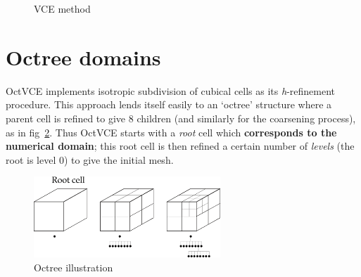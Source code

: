 \documentclass[pdftex, 12pt, a4paper]{report}
\begin{document}
\begin{figure}[htp]
        \centering
        \label{fig:VCE}
        \caption{VCE method}
\end{figure}

\section{Octree domains}\label{sec:domain}

OctVCE implements isotropic subdivision of cubical cells as its \emph{h}-refinement procedure.  This approach lends itself
easily to an `octree' structure where a parent cell is refined to give 8 children (and similarly for the coarsening process),
as in fig~\ref{fig:octree_diag}.  Thus OctVCE starts with a \emph{root} cell which \textbf{corresponds to the numerical domain};
this root cell is then refined a certain number of \emph{levels} (the root is level 0) to give the initial mesh.

\begin{figure}[htp]
  \centering
  \label{fig:octree_diag}
  \includegraphics[width=7cm]{pics/octree_diag.jpg}
  \caption{Octree illustration}
\end{figure}
\end{document}
